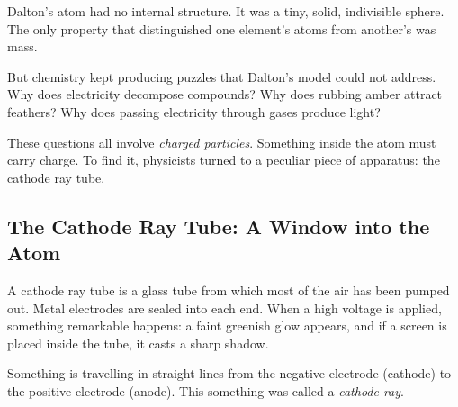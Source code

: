 \documentclass[12pt, a4paper]{book}
\theoremstyle{definition}
\newcommand{\newterm}[1]{\textit{\textcolor{DiscoveryColor}{#1}}}
\begin{document}
Dalton's atom had no internal structure.
It was a tiny, solid, indivisible sphere.
The only property that distinguished one element's atoms
from another's was mass.

But chemistry kept producing puzzles that Dalton's model
could not address.
Why does electricity decompose compounds?
Why does rubbing amber attract feathers?
Why does passing electricity through gases produce light?

These questions all involve \emph{charged particles}.
Something inside the atom must carry charge.
To find it, physicists turned to a peculiar piece of apparatus:
the cathode ray tube.

\subsection{The Cathode Ray Tube: A Window into the Atom}

A cathode ray tube is a glass tube from which most of the air
has been pumped out.
Metal electrodes are sealed into each end.
When a high voltage is applied, something remarkable happens:
a faint greenish glow appears, and if a screen is placed
inside the tube, it casts a sharp shadow.

Something is travelling in straight lines from the
negative electrode (cathode) to the positive electrode (anode).
This something was called a \newterm{cathode ray}.
\end{document}
